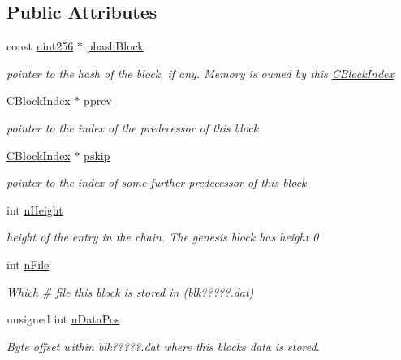 \subsection*{Public Attributes}
\begin{DoxyCompactItemize}
\item 
const \hyperlink{classuint256}{uint256} $\ast$ \hyperlink{class_c_block_index_afac8099e03ffda463c7153ca82d37b66}{phash\+Block}
\begin{DoxyCompactList}\small\item\em pointer to the hash of the block, if any. Memory is owned by this \hyperlink{class_c_block_index}{C\+Block\+Index} \end{DoxyCompactList}\item 
\hyperlink{class_c_block_index}{C\+Block\+Index} $\ast$ \hyperlink{class_c_block_index_a1ef11137155df1dd5c81491630cece39}{pprev}
\begin{DoxyCompactList}\small\item\em pointer to the index of the predecessor of this block \end{DoxyCompactList}\item 
\hyperlink{class_c_block_index}{C\+Block\+Index} $\ast$ \hyperlink{class_c_block_index_ab6242bb77bc01617f5b402d14e6a3883}{pskip}
\begin{DoxyCompactList}\small\item\em pointer to the index of some further predecessor of this block \end{DoxyCompactList}\item 
int \hyperlink{class_c_block_index_aebfc8d6b95852546760e742553d7bfd5}{n\+Height}
\begin{DoxyCompactList}\small\item\em height of the entry in the chain. The genesis block has height 0 \end{DoxyCompactList}\item 
int \hyperlink{class_c_block_index_a3653cb1e1bc3fa3fcdf1ed50ff93b50a}{n\+File}
\begin{DoxyCompactList}\small\item\em Which \# file this block is stored in (blk?????.dat) \end{DoxyCompactList}\item 
unsigned int \hyperlink{class_c_block_index_af164283dfb2d62ac44be8d10446bce4a}{n\+Data\+Pos}
\begin{DoxyCompactList}\small\item\em Byte offset within blk?????.dat where this block\textquotesingle{}s data is stored. \end{DoxyCompactList}\item 

\end{DoxyCompactItemize}
